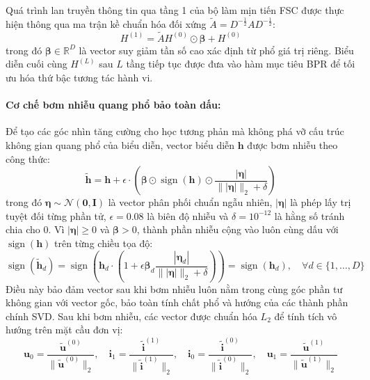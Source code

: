Quá trình lan truyền thông tin qua tầng 1 của bộ làm mịn tiến FSC được thực hiện thông qua ma trận kề chuẩn hóa đối xứng $\tilde{A} = D^{-\frac{1}{2}} A D^{-\frac{1}{2}}$:
\begin{equation}
H^{(1)} = \tilde{A} H^{(0)} \odot \boldsymbol{\beta} + H^{(0)}
\end{equation}
trong đó $\boldsymbol{\beta} \in \mathbb{R}^D$ là vector suy giảm tần số cao xác định từ phổ giá trị riêng. Biểu diễn cuối cùng $H^{(L)}$ sau $L$ tầng tiếp tục được đưa vào hàm mục tiêu BPR để tối ưu hóa thứ bậc tương tác hành vi.

\paragraph{Cơ chế bơm nhiễu quang phổ bảo toàn dấu:}
Để tạo các góc nhìn tăng cường cho học tương phản mà không phá vỡ cấu trúc không gian quang phổ của biểu diễn, vector biểu diễn $\mathbf{h}$ được bơm nhiễu theo công thức:
\begin{equation}
\tilde{\mathbf{h}} = \mathbf{h} + \epsilon \cdot \left( \boldsymbol{\beta} \odot \operatorname{sign}(\mathbf{h}) \odot \frac{|\boldsymbol{\eta}|}{\||\boldsymbol{\eta}|\|_2 + \delta} \right)
\end{equation}
trong đó $\boldsymbol{\eta} \sim \mathcal{N}(\mathbf{0}, \mathbf{I})$ là vector phân phối chuẩn ngẫu nhiên, $|\boldsymbol{\eta}|$ là phép lấy trị tuyệt đối từng phần tử, $\epsilon = 0.08$ là biên độ nhiễu và $\delta = 10^{-12}$ là hằng số tránh chia cho 0. Vì $|\boldsymbol{\eta}| \ge 0$ và $\boldsymbol{\beta} > 0$, thành phần nhiễu cộng vào luôn cùng dấu với $\operatorname{sign}(\mathbf{h})$ trên từng chiều tọa độ:
\begin{equation}
\operatorname{sign}(\tilde{\mathbf{h}}_d) = \operatorname{sign}\left( \mathbf{h}_d \cdot \left( 1 + \epsilon \boldsymbol{\beta}_d \frac{|\boldsymbol{\eta}_d|}{\||\boldsymbol{\eta}|\|_2 + \delta} \right) \right) = \operatorname{sign}(\mathbf{h}_d), \quad \forall d \in \{1, \dots, D\}
\end{equation}
Điều này bảo đảm vector sau khi bơm nhiễu luôn nằm trong cùng góc phần tư không gian với vector gốc, bảo toàn tính chất phổ và hướng của các thành phần chính SVD. Sau khi bơm nhiễu, các vector được chuẩn hóa $L_2$ để tính tích vô hướng trên mặt cầu đơn vị:
\begin{equation}
\mathbf{u}_0 = \frac{\tilde{\mathbf{u}}^{(0)}}{\|\tilde{\mathbf{u}}^{(0)}\|_2}, \quad \mathbf{i}_1 = \frac{\tilde{\mathbf{i}}^{(1)}}{\|\tilde{\mathbf{i}}^{(1)}\|_2}, \quad \mathbf{i}_0 = \frac{\tilde{\mathbf{i}}^{(0)}}{\|\tilde{\mathbf{i}}^{(0)}\|_2}, \quad \mathbf{u}_1 = \frac{\tilde{\mathbf{u}}^{(1)}}{\|\tilde{\mathbf{u}}^{(1)}\|_2}
\end{equation}

